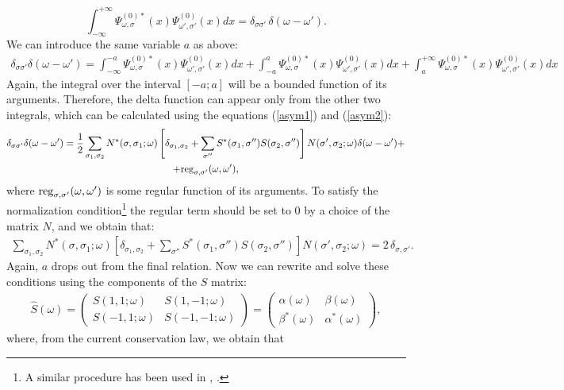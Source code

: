 \documentclass[12pt]{article}
\numberwithin{equation}{section}
\begin{document}
$$
\int^{+\infty}_{-\infty}\mathit{\Psi}^{(0)*}_{\omega,\sigma}(x)\mathit{\Psi}^{(0)}_{\omega',\sigma'}(x)dx = \delta_{\sigma\sigma'} \, \delta(\omega - \omega').
$$
We can introduce the same variable $a$ as above:
\begin{gather}
\delta_{\sigma\sigma'}\delta(\omega - \omega')=\int^{-a}_{-\infty}\mathit{\Psi}^{(0)*}_{\omega,\sigma}(x)\mathit{\Psi}^{(0)}_{\omega',\sigma'}(x)dx +\int^{a}_{-a}\mathit{\Psi}^{(0)*}_{\omega,\sigma}(x)\mathit{\Psi}^{(0)}_{\omega',\sigma'}(x)dx + \int^{+\infty}_{a}\mathit{\Psi}^{(0)*}_{\omega,\sigma}(x)\mathit{\Psi}^{(0)}_{\omega',\sigma'}(x)dx
\end{gather}
Again, the integral over the interval $[-a;a]$ will be a bounded function of its arguments. Therefore, the delta function can appear only from the other two integrals, which can be calculated using the equations (\ref{asym1}) and (\ref{asym2}):
\begin{gather}
\delta_{\sigma\sigma'}\delta(\omega - \omega')=\frac{1}{2}\sum_{\sigma_1,\sigma_2}N^*(\sigma,\sigma_1;\omega)\left[\delta_{\sigma_1,\sigma_2}+\sum_{\sigma''}S^*(\sigma_1,\sigma'')S(\sigma_2,\sigma'')\right]N(\sigma',\sigma_2;\omega) \delta(\omega - \omega')+\nonumber\\+{\rm reg}_{\sigma,\sigma'}(\omega,\omega'),
\end{gather}
where ${\rm reg}_{\sigma,\sigma'}(\omega,\omega')$ is some regular function of its arguments. To satisfy the normalization condition\footnote{A similar procedure has been used in \cite{Akhmedov:2019rvx}, \cite{Lanina:2020yvh}.} the regular term should be set to $0$ by a choice of the matrix $N$, and we obtain that:
\begin{gather}\label{normcond}
\sum_{\sigma_1,\sigma_2}N^*(\sigma,\sigma_1;\omega)\left[\delta_{\sigma_1,\sigma_2}+\sum_{\sigma''}S^*(\sigma_1,\sigma'')S(\sigma_2,\sigma'')\right]N(\sigma',\sigma_2;\omega) = 2\, \delta_{\sigma,\sigma'}.
\end{gather}
Again, $a$ drops out from the final relation. Now we can rewrite and solve these conditions using the components of the $S$ matrix:
\begin{gather}\label{matrxiel}
\hat{S}(\omega)=\begin{pmatrix}
		S(1,1;\omega) & S(1,-1;\omega)\\
		S(-1,1;\omega) & S(-1,-1;\omega)
	\end{pmatrix}=\begin{pmatrix}
		\alpha(\omega) & \beta(\omega)\\
		\beta^*(\omega) & \alpha^*(\omega)
	\end{pmatrix},
\end{gather}
where, from the current conservation law, we obtain that 
\end{document}

